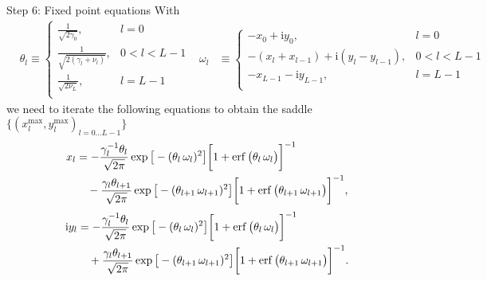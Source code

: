 \documentclass[8pt]{beamer}
\begin{document}
\begin{frame}[label={sec:orgc279062}]{Step 6: Fixed point equations}
With
\begin{align*}
&\theta_{l} \equiv
\begin{cases}
\frac{1}{\sqrt{2 \gamma_0}}, & l = 0 \\
\frac{1}{\sqrt{2 (\gamma_{l} + \nu_{l})}}, & 0 < l < L - 1 \\
\frac{1}{\sqrt{2 \nu_{L}}}, & l = L - 1\\
\end{cases}
&
\omega_{l} &\equiv
\begin{cases}
- x_{0} + \mathrm{i} y_{0}, & l = 0 \\
- (x_{l} + x_{l-1}) + \mathrm{i} (y_{l} - y_{l-1}), & 0 < l < L - 1\\
- x_{L-1} - \mathrm{i} y_{L-1}, & l = L - 1\\
\end{cases}
\end{align*}
we need to iterate the following equations to obtain the saddle \(\big\{(x_{l}^{\text{max}} , y_{l}^{\text{max}})_{l=0 \ldots L-1} \big \}\)
\begin{align*}
x_{l} &= - \frac{\gamma_{l}^{-1} \theta_{l}}{\sqrt{2 \pi}} \exp \big[- (\theta_{l} \thinspace \omega_{l})^{2} \big] \bigg[1 + \operatorname{erf}\big( \theta_{l} \thinspace \omega_{l} \big) \bigg]^{-1} \\
&\quad - \frac{\gamma_{l} \theta_{l+1}}{\sqrt{2 \pi}} \exp \big[- (\theta_{l+1} \thinspace \omega_{l+1})^{2} \big] \bigg[1 + \operatorname{erf}\big( \theta_{l+1} \thinspace \omega_{l+1} \big) \bigg]^{-1},
\end{align*}
\begin{align*}
\mathrm{i} y_{l} &= - \frac{\gamma_{l}^{-1} \theta_{l}}{\sqrt{2 \pi}} \exp \big[- (\theta_{l} \thinspace \omega_{l})^{2} \big] \bigg[1 + \operatorname{erf}\big( \theta_{l} \thinspace \omega_{l} \big) \bigg]^{-1} \\
&\quad + \frac{\gamma_{l} \theta_{l+1}}{\sqrt{2 \pi}} \exp \big[- (\theta_{l+1} \thinspace \omega_{l+1})^{2} \big] \bigg[1 + \operatorname{erf}\big( \theta_{l+1} \thinspace \omega_{l+1} \big) \bigg]^{-1}.
\end{align*}
\end{frame}
\end{document}
